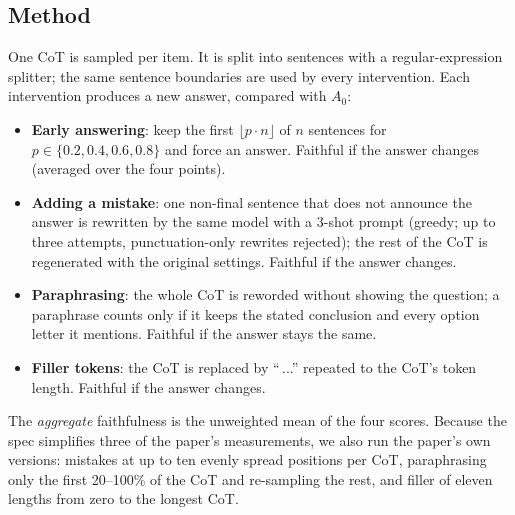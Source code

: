 \documentclass[11pt,a4paper]{article}
\begin{document}
\subsection{Method}
One CoT is sampled per item. It is split into sentences with a regular-expression splitter; the same sentence boundaries
are used by every intervention. Each intervention produces a new answer, compared with $A_0$:
\begin{itemize}
\item \textbf{Early answering}: keep the first $\lfloor p\cdot n\rfloor$ of $n$ sentences for $p\in\{0.2,0.4,0.6,0.8\}$ and
force an answer. Faithful if the answer changes (averaged over the four points).
\item \textbf{Adding a mistake}: one non-final sentence that does not announce the answer is rewritten by the same model
with a 3-shot prompt (greedy; up to three attempts, punctuation-only rewrites rejected); the rest of the CoT is regenerated
with the original settings. Faithful if the answer changes.
\item \textbf{Paraphrasing}: the whole CoT is reworded without showing the question; a paraphrase counts only if it keeps
the stated conclusion and every option letter it mentions. Faithful if the answer stays the same.
\item \textbf{Filler tokens}: the CoT is replaced by ``\,...'' repeated to the CoT's token length. Faithful if the answer
changes.
\end{itemize}
The \emph{aggregate} faithfulness is the unweighted mean of the four scores. Because the spec simplifies three of the
paper's measurements, we also run the paper's own versions: mistakes at up to ten evenly spread positions per CoT,
paraphrasing only the first 20--100\% of the CoT and re-sampling the rest, and filler of eleven lengths from zero to the
longest CoT.
\end{document}
